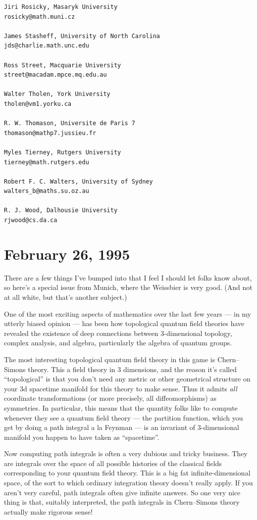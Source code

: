 \documentclass{article}
\begin{document}
\begin{verbatim}
Jiri Rosicky, Masaryk University
rosicky@math.muni.cz
 
James Stasheff, University of North Carolina
jds@charlie.math.unc.edu
 
Ross Street, Macquarie University 
street@macadam.mpce.mq.edu.au
 
Walter Tholen, York University
tholen@vm1.yorku.ca
 
R. W. Thomason, Universite de Paris 7
thomason@mathp7.jussieu.fr
 
Myles Tierney, Rutgers University
tierney@math.rutgers.edu
 
Robert F. C. Walters, University of Sydney
walters_b@maths.su.oz.au
 
R. J. Wood, Dalhousie University
rjwood@cs.da.ca
\end{verbatim}



\hypertarget{week48}{%
\section{February 26, 1995}\label{week48}}

There are a few things I've bumped into that I feel I should let folks
know about, so here's a special issue from Munich, where the Weissbier
is very good. (And not at all white, but that's another subject.)

One of the most exciting aspects of mathematics over the last few years
--- in my utterly biased opinion --- has been how topological quantum
field theories have revealed the existence of deep connections between
\(3\)-dimensional topology, complex analysis, and algebra, particularly
the algebra of quantum groups.

The most interesting topological quantum field theory in this game is
Chern--Simons theory. This a field theory in 3 dimensions, and the reason
it's called ``topological'' is that you don't need any metric or other
geometrical structure on your 3d spacetime manifold for this theory to
make sense. Thus it admits \emph{all} coordinate transformations (or
more precisely, all diffeomorphisms) as symmetries. In particular, this
means that the quantity folks like to compute whenever they see a
quantum field theory --- the partition function, which you get by doing
a path integral a la Feynman --- is an invariant of \(3\)-dimensional
manifold you happen to have taken as ``spacetime''.

Now computing path integrals is often a very dubious and tricky
business. They are integrals over the space of all possible histories of
the classical fields corresponding to your quantum field theory. This is
a big fat infinite-dimensional space, of the sort to which ordinary
integration theory doesn't really apply. If you aren't very careful,
path integrals often give infinite answers. So one very nice thing is
that, suitably interpreted, the path integrals in Chern--Simons theory
actually make rigorous sense!
\end{document}
